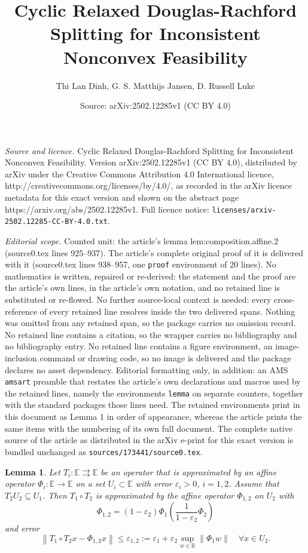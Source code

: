 \documentclass[10pt,a4paper]{amsart}
\title{Cyclic Relaxed Douglas-Rachford Splitting for Inconsistent Nonconvex Feasibility}
\author{Thi Lan Dinh, G. S. Matthijs Jansen, D. Russell Luke}
\date{Source: arXiv:2502.12285v1 (CC BY 4.0)}
\newtheorem{lemma}{Lemma}
\begin{document}
\maketitle

\noindent\emph{Source and licence.} Cyclic Relaxed Douglas-Rachford Splitting for Inconsistent Nonconvex Feasibility. Version arXiv:2502.12285v1 (CC BY 4.0), distributed by arXiv under the Creative Commons Attribution 4.0 International licence, http://creativecommons.org/licenses/by/4.0/, as recorded in the arXiv licence metadata for this exact version and shown on the abstract page https://arxiv.org/abs/2502.12285v1. Full licence notice: \texttt{licenses/arxiv-2502.12285-CC-BY-4.0.txt}.\par\smallskip

\noindent\textit{Editorial scope.} Counted unit: the article's lemma lem:composition.affine.2 (source0.tex lines 925--937). The article's complete original proof of it is delivered with it (source0.tex lines 938--957, one \texttt{proof} environment of 20 lines). No mathematics is written, repaired or re-derived: the statement and the proof are the article's own lines, in the article's own notation, and no retained line is substituted or re-flowed.  No further source-local context is needed: every cross-reference of every retained line resolves inside the two delivered spans.  Nothing was omitted from any retained span, so the package carries no omission record.  No retained line contains a citation, so the wrapper carries no bibliography and no bibliography entry.  No retained line contains a figure environment, an image-inclusion command or drawing code, so no image is delivered and the package declares no asset dependency.  Editorial formatting only, in addition: an AMS \texttt{amsart} preamble that restates the article's own declarations and macros used by the retained lines, namely the environments \texttt{lemma} on separate counters, together with the standard packages those lines need.  The retained environments print in this document as Lemma 1 in order of appearance, whereas the article prints the same items with the numbering of its own full document.  The complete native source of the article as distributed in the arXiv e-print for this exact version is bundled unchanged as \texttt{sources/173441/source0.tex}.
\begin{lemma}\label{lem:composition.affine.2}
Let $T_i:\mathbb E\rightrightarrows \mathbb E$ be an operator that is approximated by an affine operator $\Phi_i:\mathbb E\to \mathbb E$ on a set $U_i\subset \mathbb E$ with error $\varepsilon_i>0$,  $i=1,2$.
Assume that $T_2U_2\subseteq U_1$.
Then $T_1\circ T_2$ is approximated by the affine operator $\Phi_{1,2}$ on $U_2$ with
\begin{equation}
\Phi_{1,2}=(1-\varepsilon_2)\Phi_1(\frac{1}{1-\varepsilon_2}\Phi_2)
\end{equation}
and error
\begin{equation}
\left\|T_1\circ T_2x- \Phi_{1,2}x \right\|\leq
\varepsilon_{1,2}:=\varepsilon_1+\varepsilon_2 \sup_{w\in\mathbb B}{\|\Phi_1w\|}\quad \forall x\in U_2.
\end{equation}
\end{lemma}
\end{document}
